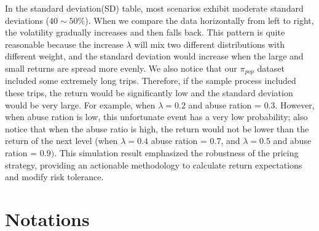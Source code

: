 \documentclass[12pt]{article}
\begin{document}
{{{{{{\begin{appendices}
In the standard deviation(SD) table, most scenarios exhibit moderate standard deviations ($40\sim50\%$). When we compare the data horizontally from left to right, the volatility gradually increases and then falls back. This pattern is quite reasonable because the increase $\lambda$ will mix two different distributions with different weight, and the standard deviation would increase when the large and small returns are spread more evenly. We also notice that our $\pi_{pop}$ dataset included some extremely long trips. Therefore, if the sample process included these trips, the return would be significantly low and the standard deviation would be very large. For example, when $\lambda=0.2$ and abuse ration = $0.3.$ However, when abuse ration is low, this unfortunate event has a very low probability; also notice that when the abuse ratio is high, the return would not be lower than the return of the next level (when $\lambda=0.4$ abuse ration = $0.7$, and $\lambda=0.5$ and abuse ration = $0.9)$. This simulation result emphasized the robustness of the pricing strategy, providing an actionable methodology to calculate return expectations and modify risk tolerance.

\section{Notations}



\end{appendices}}}}}}}
\end{document}
